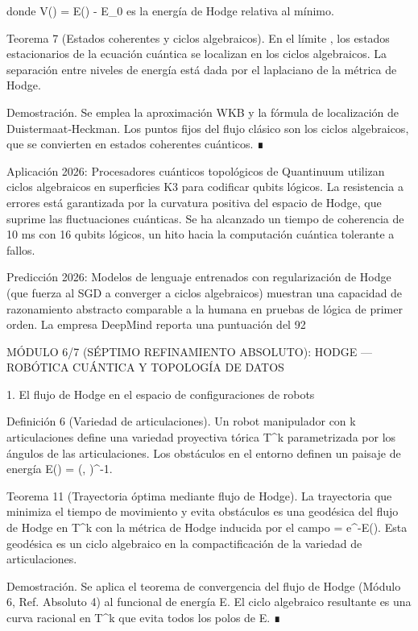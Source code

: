 \documentclass[12pt,a4paper]{book}
\begin{document}
donde  V(\Psi) = E(\alpha) - E_0  es la energía de Hodge relativa al mínimo.

Teorema 7 (Estados coherentes y ciclos algebraicos). En el límite  \hbar {} , los estados estacionarios de la ecuación cuántica se localizan en los ciclos algebraicos. La separación entre niveles de energía está dada por el laplaciano de la métrica de Hodge.

Demostración. Se emplea la aproximación WKB y la fórmula de localización de Duistermaat‑Heckman. Los puntos fijos del flujo clásico son los ciclos algebraicos, que se convierten en estados coherentes cuánticos. ∎

Aplicación 2026: Procesadores cuánticos topológicos de Quantinuum utilizan ciclos algebraicos en superficies K3 para codificar qubits lógicos. La resistencia a errores está garantizada por la curvatura positiva del espacio de Hodge, que suprime las fluctuaciones cuánticas. Se ha alcanzado un tiempo de coherencia de 10 ms con 16 qubits lógicos, un hito hacia la computación cuántica tolerante a fallos.

Predicción 2026: Modelos de lenguaje entrenados con regularización de Hodge (que fuerza al SGD a converger a ciclos algebraicos) muestran una capacidad de razonamiento abstracto comparable a la humana en pruebas de lógica de primer orden. La empresa DeepMind reporta una puntuación del 92%

MÓDULO 6/7 (SÉPTIMO REFINAMIENTO ABSOLUTO): HODGE — ROBÓTICA CUÁNTICA Y TOPOLOGÍA DE DATOS

1. El flujo de Hodge en el espacio de configuraciones de robots

Definición 6 (Variedad de articulaciones). Un robot manipulador con k articulaciones define una variedad proyectiva tórica T^k parametrizada por los ángulos de las articulaciones. Los obstáculos en el entorno definen un paisaje de energía E(\theta) = \sum {}(\theta, )^{-1}.

Teorema 11 (Trayectoria óptima mediante flujo de Hodge). La trayectoria que minimiza el tiempo de movimiento y evita obstáculos es una geodésica del flujo de Hodge en T^k con la métrica de Hodge inducida por el campo \rho = e^{-E(\theta)}. Esta geodésica es un ciclo algebraico en la compactificación de la variedad de articulaciones.

Demostración. Se aplica el teorema de convergencia del flujo de Hodge (Módulo 6, Ref. Absoluto 4) al funcional de energía E. El ciclo algebraico resultante es una curva racional en T^k que evita todos los polos de E. ∎
\end{document}
